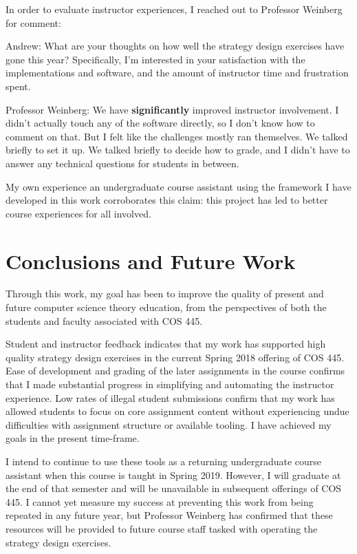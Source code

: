 \documentclass[pageno]{jpaper}
\begin{document}
In order to evaluate instructor experiences, I reached out to Professor Weinberg for comment:
\begin{displayquote}
Andrew: What are your thoughts on how well the strategy design exercises have gone this year? Specifically, I'm interested in your satisfaction with the implementations and software, and the amount of instructor time and frustration spent.

Professor Weinberg: We have \textbf{significantly} improved instructor involvement. I didn't actually touch any of the software directly, so I don't know how to comment on that. But I felt like the challenges mostly ran themselves. We talked briefly to set it up. We talked briefly to decide how to grade, and I didn't have to answer any technical questions for students in between.
\end{displayquote}
My own experience an undergraduate course assistant using the framework I have developed in this work corroborates this claim: this project has led to better course experiences for all involved.

\section*{Conclusions and Future Work}
Through this work, my goal has been to improve the quality of present and future computer science theory education, from the perspectives of both the students and faculty associated with COS 445.

Student and instructor feedback indicates that my work has supported high quality strategy design exercises in the current Spring 2018 offering of COS 445.
Ease of development and grading of the later assignments in the course confirms that I made substantial progress in simplifying and automating the instructor experience.
Low rates of illegal student submissions confirm that my work has allowed students to focus on core assignment content without experiencing undue difficulties with assignment structure or available tooling.
I have achieved my goals in the present time-frame.

I intend to continue to use these tools as a returning undergraduate course assistant when this course is taught in Spring 2019.
However, I will graduate at the end of that semester and will be unavailable in subsequent offerings of COS 445.
I cannot yet measure my success at preventing this work from being repeated in any future year, but Professor Weinberg has confirmed that these resources will be provided to future course staff tasked with operating the strategy design exercises.
\end{document}
